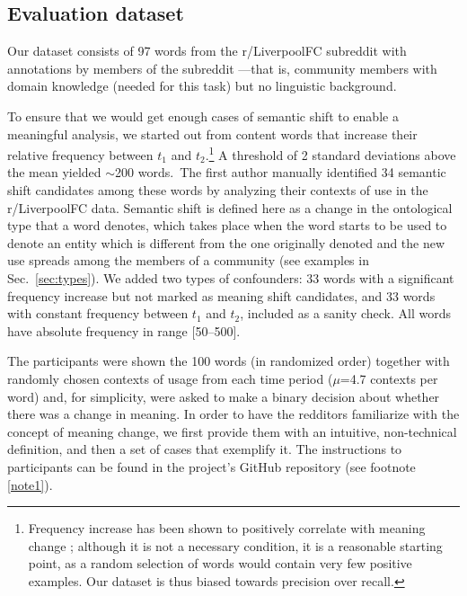 

\subsection{Evaluation dataset}
\label{subsec:Evaluation dataset}

Our dataset consists of 97 words from the r/LiverpoolFC subreddit with
annotations by members of the subreddit ---that is, community members
with domain knowledge (needed for this task) but no linguistic
background.

To ensure that we would get enough cases of semantic shift to enable a
meaningful analysis, we started out from content words that increase
their relative frequency between $t_1$ and $t_2$.\footnote{Frequency
  increase has been shown to positively correlate with meaning change
  \cite{wijaya2011understanding,kulkarni2015statistically}; although
  it is not a necessary condition, it is a reasonable starting point,
  as a random selection of words would contain very few positive
  examples. Our dataset is thus biased towards precision over recall.}
A threshold of 2 standard deviations above the mean yielded
$\sim$200 words.~The first author manually identified 34 semantic
shift candidates among these words by analyzing their contexts of use
in the r/LiverpoolFC data.  Semantic shift is defined here as a change
in the ontological type that a word denotes, which takes place when the word starts to be used to denote an entity which is different from the one originally denoted and the new use spreads among the members of a community (see examples in Sec.~\ref{sec:types}).
We added two types of confounders: 33 words
with a significant frequency increase but not marked as meaning
shift candidates, and 33 words with constant frequency between $t_1$
and $t_2$, included as a sanity check. All words have
  absolute frequency in range [50--500].

The participants were shown the 100 words (in randomized order)
together with randomly chosen contexts of usage from each time period
($\mu$=4.7 contexts per word) and, for simplicity, were asked to make
a binary decision about whether there was a change in meaning. In order to have the redditors familiarize with the concept of meaning change, we first provide them with an intuitive, non-technical definition, and then a set of cases that exemplify it. The instructions to participants can be found in the project's GitHub repository (see footnote \ref{note1}).

